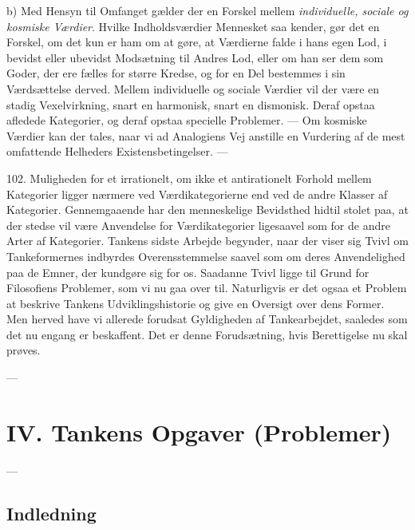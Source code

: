 \documentclass[12pt,a4paper]{book}
\newcommand{\opage}[1]{\marginnote{\footnotesize\textit{[#1]}}}
\begin{document}
b) Med Hensyn til Omfanget gælder der en Forskel mellem \emph{individuelle, sociale
og kosmiske Værdier}. Hvilke Indholdsværdier Mennesket saa kender, gør det en
Forskel, om det kun er ham om at gøre, at Værdierne falde i hans egen Lod, i
bevidst eller ubevidst Modsætning til Andres Lod, eller om han ser dem som Goder,
der ere fælles for større Kredse, og for en Del bestemmes i sin Værdsættelse
derved. Mellem individuelle og sociale Værdier vil der være en stadig
Vexelvirkning, snart en harmonisk, snart en dismonisk. Deraf opstaa afledede
Kategorier, og deraf opstaa specielle Problemer. --- Om kosmiske Værdier kan der
tales, naar vi ad Analogiens Vej anstille en Vurdering af de mest omfattende
Helheders Existensbetingelser. ---

102. Muligheden for et irrationelt, om ikke et antirationelt Forhold mellem
Kategorier ligger nærmere ved Værdikategorierne end ved de andre Klasser af
Kategorier. Gennemgaaende har den menneskelige Bevidsthed hidtil stolet paa, at
der stedse vil være Anvendelse for Værdikategorier ligesaavel som for de andre
Arter af Kategorier. Tankens sidste Arbejde begynder, naar der viser sig Tvivl om
Tankeformernes indbyrdes Overensstemmelse saavel som om deres Anvendelighed paa de
Emner, der kundgøre sig for os. Saadanne Tvivl ligge til Grund for Filosofiens
Problemer, som vi nu gaa over til. Naturligvis er det ogsaa et Problem at
\opage{245}beskrive
Tankens Udviklingshistorie og give en Oversigt over dens Former. Men herved have
vi allerede forudsat Gyldigheden af Tankearbejdet, saaledes som det nu engang er
beskaffent. Det er denne Forudsætning, hvis Berettigelse nu skal prøves.

\begin{center}---\end{center}

\opage{246} \chapter*{IV. Tankens Opgaver (Problemer)}
\label{ch:opgaver}

\begin{center}---\end{center}

\section*{Indledning}
\end{document}
